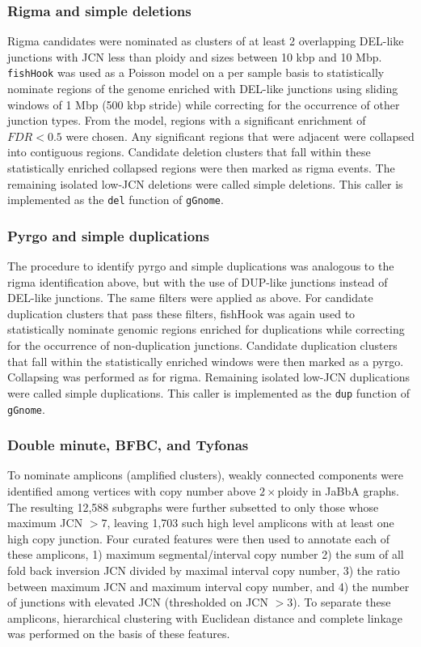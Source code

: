 \documentclass[phd,tocprelim]{cornell}
\newcommand{\ttt}[1]{\texttt{#1}}
\begin{document}
\subsubsection*{Rigma and simple deletions}
Rigma candidates were nominated as clusters of at least 2 overlapping DEL-like junctions with JCN less than ploidy and sizes between 10 kbp and 10 Mbp. \texttt{fishHook} was used as a Poisson model on a per sample basis to statistically nominate regions of the genome enriched with DEL-like junctions using sliding windows of 1 Mbp (500 kbp stride) while correcting for the occurrence of other junction types. From the model, regions with a significant enrichment of $FDR < 0.5$ were chosen. Any significant regions that were adjacent were collapsed into contiguous regions. Candidate deletion clusters that fall within these statistically enriched collapsed regions were then marked as rigma events. The remaining isolated low-JCN deletions were called simple deletions.  This caller is implemented as the \ttt{del} function of \ttt{gGnome}.

\subsubsection*{Pyrgo and simple duplications}
The procedure to identify pyrgo and simple duplications was analogous to the rigma identification above, but with the use of DUP-like junctions instead of DEL-like junctions. The same filters were applied as above. For candidate duplication clusters that pass these filters, fishHook was again used to statistically nominate genomic regions enriched for duplications while correcting for the occurrence of non-duplication junctions. Candidate duplication clusters that fall within the statistically enriched windows were then marked as a pyrgo. Collapsing was performed as for rigma. Remaining isolated low-JCN duplications were called simple duplications. This caller is implemented as the \ttt{dup} function of \ttt{gGnome}.

\subsubsection*{Double minute, BFBC, and Tyfonas}

To nominate amplicons (amplified clusters), weakly connected components were identified among vertices with copy number above $2\times$ploidy in JaBbA graphs. The resulting 12,588 subgraphs were further subsetted to only those whose maximum JCN $>7$, leaving 1,703 such high level amplicons with at least one high copy junction. Four curated features were then used to annotate each of these amplicons, 1) maximum segmental/interval copy number 2) the sum of all fold back inversion JCN divided by maximal interval copy number, 3) the ratio between maximum JCN and maximum interval copy number, and 4) the number of junctions with elevated JCN (thresholded on JCN $> 3$). To separate these amplicons, hierarchical clustering with Euclidean distance and complete linkage was performed on the basis of these features.
\end{document}
